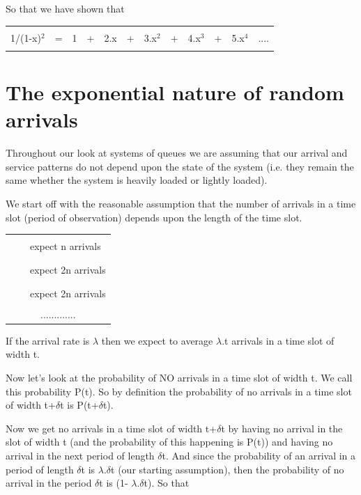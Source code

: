 \noindent
So that we have shown that

\begin{table}[hbt]\centering
\begin{tabular}{||r cc cc cc cc ccc||}
\hline
&&&&&&&&&&&\\
\hspace*{0.25in}
1/(1-x)$^2$
  & = & 
       1 & + & 2.x & + & 3.x$^2$ & + & 4.x$^3$ & + & 5.x$^4$ & .... 
\hspace*{0.25in}\\
&&&&&&&&&&&\\
\hline
\end{tabular}
\end{table}

\newpage
\section*{The exponential nature of random arrivals}

Throughout our look at systems of queues we are assuming that
our arrival and service patterns do not depend upon
the state of the system (i.e. they remain the same whether the system
is heavily loaded or lightly loaded).

We start off with the reasonable assumption that the number of
arrivals in a time slot (period of observation) 
depends upon the length of the time slot.
 
\begin{tabular}{l c l}
\rule{1in}{0.05in} & & expect n arrivals \\
\rule{2in}{0.05in} & & expect 2n arrivals \\
\rule{3in}{0.05in} & & expect 2n arrivals \\
\multicolumn{3}{c}{.............}\\
\end{tabular}

\noindent
If the arrival rate is $\lambda$ then we expect 
to average $\lambda$.t arrivals in a time slot of width t.

Now let's look at the probability of NO arrivals in a time slot 
of width t. We call this probability P(t).
So by definition the probability of no arrivals in a time slot 
of width t+$\delta$t is P(t+$\delta$t).

Now we get no arrivals in a time slot of width 
t+$\delta$t by having no arrival in the slot of width t
(and the probability of this happening is P(t))
and having no arrival in the next period of length $\delta$t.
And since the probability of an arrival in a period of length $\delta$t
is $\lambda$.$\delta$t (our starting assumption), 
then the probability of no arrival
in the period $\delta$t is (1- $\lambda$.$\delta$t).
So that 


